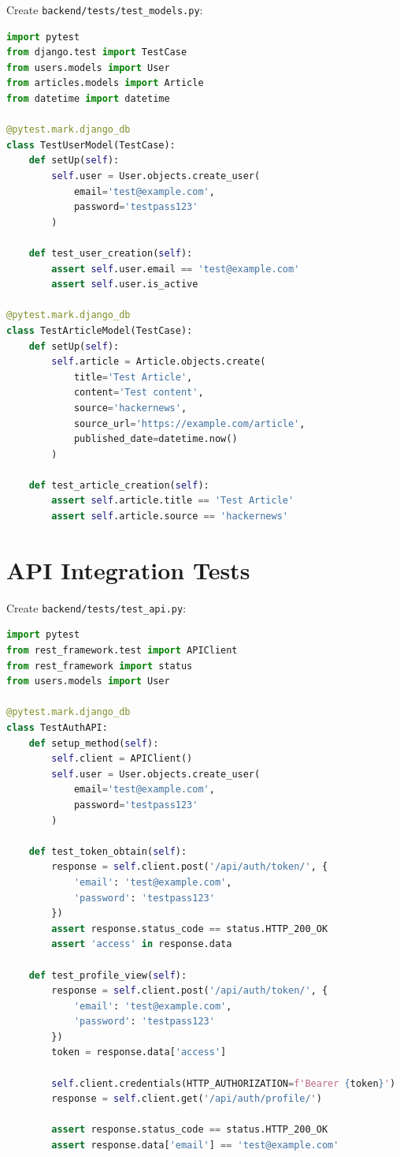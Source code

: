 \documentclass{report}
\begin{document}
Create \texttt{backend/tests/test\_models.py}:

\begin{lstlisting}[language=python, caption=Django model tests]
import pytest
from django.test import TestCase
from users.models import User
from articles.models import Article
from datetime import datetime

@pytest.mark.django_db
class TestUserModel(TestCase):
    def setUp(self):
        self.user = User.objects.create_user(
            email='test@example.com',
            password='testpass123'
        )
    
    def test_user_creation(self):
        assert self.user.email == 'test@example.com'
        assert self.user.is_active

@pytest.mark.django_db
class TestArticleModel(TestCase):
    def setUp(self):
        self.article = Article.objects.create(
            title='Test Article',
            content='Test content',
            source='hackernews',
            source_url='https://example.com/article',
            published_date=datetime.now()
        )
    
    def test_article_creation(self):
        assert self.article.title == 'Test Article'
        assert self.article.source == 'hackernews'
\end{lstlisting}

\section{API Integration Tests}

Create \texttt{backend/tests/test\_api.py}:

\begin{lstlisting}[language=python, caption=API endpoint tests]
import pytest
from rest_framework.test import APIClient
from rest_framework import status
from users.models import User

@pytest.mark.django_db
class TestAuthAPI:
    def setup_method(self):
        self.client = APIClient()
        self.user = User.objects.create_user(
            email='test@example.com',
            password='testpass123'
        )
    
    def test_token_obtain(self):
        response = self.client.post('/api/auth/token/', {
            'email': 'test@example.com',
            'password': 'testpass123'
        })
        assert response.status_code == status.HTTP_200_OK
        assert 'access' in response.data
    
    def test_profile_view(self):
        response = self.client.post('/api/auth/token/', {
            'email': 'test@example.com',
            'password': 'testpass123'
        })
        token = response.data['access']
        
        self.client.credentials(HTTP_AUTHORIZATION=f'Bearer {token}')
        response = self.client.get('/api/auth/profile/')
        
        assert response.status_code == status.HTTP_200_OK
        assert response.data['email'] == 'test@example.com'
\end{lstlisting}
\end{document}
